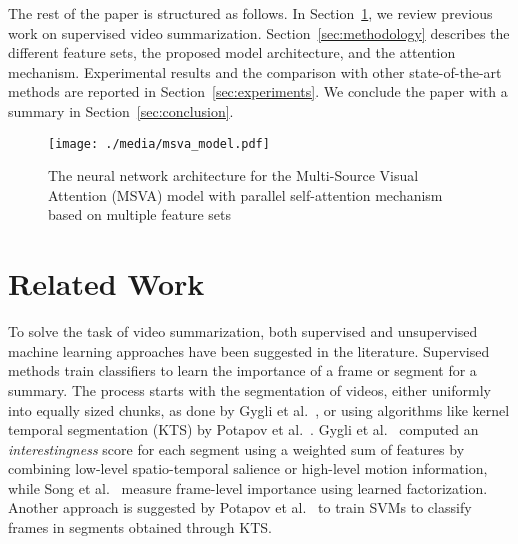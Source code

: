 \documentclass{article}
\begin{document}
The rest of the paper is structured as follows. In Section~\ref{sec:related_work}, we review previous work on supervised video summarization. Section~\ref{sec:methodology} describes the different feature sets, the proposed model architecture, and the attention mechanism. Experimental results and the comparison with other state-of-the-art methods are reported in Section~\ref{sec:experiments}. We conclude the paper with a summary in Section~\ref{sec:conclusion}.

																		
\begin{figure*}[ht]
\begin{center}
\texttt{[image: ./media/msva\_model.pdf]}
\caption{The neural network architecture for the Multi-Source Visual Attention (MSVA) model with parallel self-attention mechanism based on multiple feature sets}
\label{fig:overll_model_architecture}
\end{center}
\end{figure*}
																																																																																																																																																																																																																			   
\section{Related Work}\label{sec:related_work}

To solve the task of video summarization, both supervised and unsupervised machine learning approaches have been suggested in the literature. 
Supervised methods train classifiers to learn the importance of a frame or segment for a summary. The process starts with the segmentation of videos,  either uniformly into equally sized chunks, as done by Gygli et al.~\cite{DBLP:conf/eccv/GygliGRG14}, or using algorithms like kernel temporal segmentation (KTS) by Potapov et al.~\cite{DBLP:conf/eccv/PotapovDHS14}. Gygli et al.~\cite{DBLP:conf/eccv/GygliGRG14} computed an \textit{interestingness} score for each segment using a weighted sum of features by combining low-level spatio-temporal salience or high-level motion information, while Song et al.~\cite{DBLP:conf/cvpr/SongVSJ15} measure frame-level importance using learned factorization. Another approach is suggested by Potapov et al.~\cite{DBLP:conf/eccv/PotapovDHS14} to train SVMs to classify frames in segments obtained through KTS.
\end{document}
